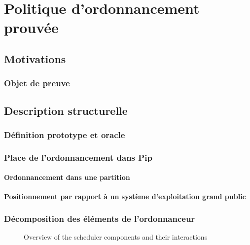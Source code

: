 \chapter{Politique d'ordonnancement prouvée}

	\section{Motivations}

		\subsection{Objet de preuve}
	

	\section{Description structurelle}

		\subsection{Définition prototype et oracle}

		\subsection{Place de l'ordonnancement dans Pip}
			\subsubsection{Ordonnancement dans une partition}
			\subsubsection{Positionnement par rapport à un système d'exploitation grand public}

		\subsection{Décomposition des éléments de l'ordonnanceur}
			\begin{figure*}[!ht]
			    \centering
			    
			    \caption{Overview of the scheduler components and their interactions}
			    \label{fig:project_overview}
			\end{figure*}
